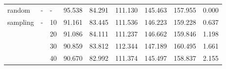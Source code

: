 \begin{tabular}{lllrrrrrr}
random & - & - &      95.538 & 84.291 & 111.130 & 145.463 & 157.955 &                0.000 \\
sampling & - & 10 &      91.161 & 83.445 & 111.536 & 146.223 & 159.228 &                0.637 \\
         &   & 20 &      91.086 & 84.111 & 111.237 & 146.662 & 159.846 &                1.198 \\
         &   & 30 &      90.859 & 83.812 & 112.344 & 147.189 & 160.495 &                1.661 \\
         &   & 40 &      90.670 & 82.992 & 111.374 & 145.497 & 158.837 &                2.155 \\
\bottomrule
\end{tabular}
